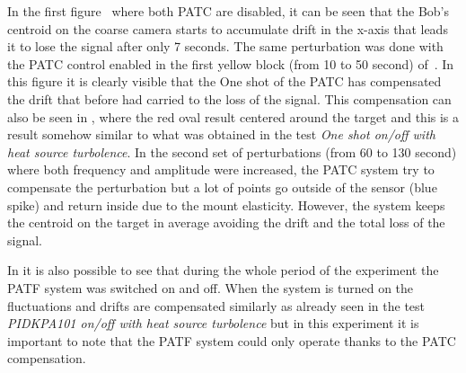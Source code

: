 In the first figure~ where both PATC are disabled, it can be seen that the Bob's centroid on the coarse camera starts to accumulate drift in the x-axis that leads it to lose the signal after only 7 seconds.
The same perturbation was done with the PATC control enabled in the first yellow block (from 10 to 50 second) of~.
In this figure it is clearly visible that the One shot of the PATC has compensated the drift that before had carried to the loss of the signal. This compensation can also be seen in , where the red oval result centered around the target and this is a result somehow similar to what was obtained in the test \textit{One shot on/off with heat source turbolence}.
In the second set of perturbations (from 60 to 130 second) where both frequency and amplitude were increased, the PATC system try to compensate the perturbation but a lot of points go outside of the sensor (blue spike) and return inside due to the mount elasticity. However, the system keeps the centroid on the target in average avoiding the drift and the total loss of the signal.

In  it is also possible to see that during the whole period of the experiment the PATF system was switched on and off.
When the system is turned on the fluctuations and drifts are compensated similarly as already seen in the test \textit{PIDKPA101 on/off with heat source turbolence} but in this experiment it is important to note that the PATF system could only operate thanks to the PATC compensation.
